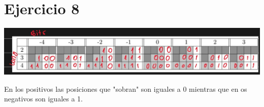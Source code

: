 \section*{Ejercicio 8}

\includegraphics[width=18cm]{./static/P1E8.jpg}

En los positivos las posiciones que "sobran" son iguales a 0 mientras que en os negativos son iguales a 1.